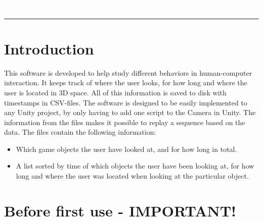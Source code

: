 \documentclass[letterpaper]{article}
\author{%
    Halse, Douglas \\
    Karlsson, Mattias \\
    Larsson, Johan \\
    Persson, Hannes \\
    Östmo, Marcus \\
    }
\makeatletter
\def\printauthor{%
    {\large \@author}}
\makeatother
\begin{document}
\begin{titlepage}
\BgThispage
{}
\vspace*{2cm}
\noindent
\textcolor{white}{\bigsf Sight tracking in Unity}
\vspace*{2.5cm}\par
\noindent
\begin{minipage}{0.35\linewidth}
    \begin{flushright}
        \printauthor
    \end{flushright}
\end{minipage} \hspace{15pt}
%
\begin{minipage}{0.02\linewidth}
    \rule{1pt}{175pt}
\end{minipage} \hspace{-10pt}
%
\begin{minipage}{0.6\linewidth}
\vspace{-2in}
\end{minipage}
\end{titlepage}
\restoregeometry
\tableofcontents
\newpage
\section{Introduction}
This software is developed to help study different behaviors in human-computer interaction. It keeps track of where the user looks, for how long and where the user is located in 3D space. All of this information is saved to disk with timestamps in CSV-files. The software is designed to be easily implemented to any Unity project, by only having to add one script to the Camera in Unity. The information from the files makes it possible to replay a sequence based on the data.
The files contain the following information:\\
\begin{itemize}
\item Which game objects the user have looked at, and for how long in total.\\
\item A list sorted by time of which objects the user have been looking at, for how long and where the user was located when looking at the particular object.
\end{itemize}
\newpage
\section{Before first use - IMPORTANT!}
\end{document}
